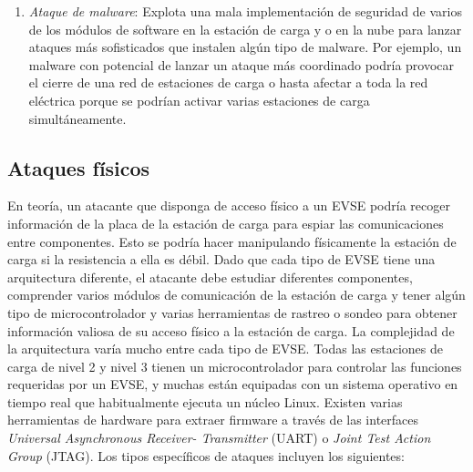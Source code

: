 \documentclass[12pt,a4paper,onecolumn,oneside]{report}
\begin{document}
\begin{enumerate}
\item \textit{Ataque de malware}: Explota una mala implementación de seguridad de varios de los módulos de software en la estación de carga y o en la nube para lanzar ataques más sofisticados que instalen algún tipo de malware. Por ejemplo, un malware con potencial de lanzar un ataque más coordinado podría provocar el cierre de una red de estaciones de carga o hasta afectar a toda la red eléctrica porque se podrían activar varias estaciones de carga simultáneamente.

\end{enumerate}



\subsection{Ataques físicos}

En teoría, un atacante que disponga de acceso físico a un EVSE podría recoger información de la placa de la estación de carga para espiar las comunicaciones entre componentes. Esto se podría hacer manipulando físicamente la estación de carga si la resistencia a ella es débil. Dado que cada tipo de EVSE tiene una arquitectura diferente, el atacante debe estudiar diferentes componentes, comprender varios módulos de comunicación de la estación de carga y tener algún tipo de microcontrolador y varias herramientas de rastreo o sondeo para obtener información valiosa de su acceso físico a la estación de carga. La complejidad de la arquitectura varía mucho entre cada tipo de EVSE. Todas las estaciones de carga de nivel 2 y nivel 3 tienen un microcontrolador para controlar las funciones requeridas por un EVSE, y muchas están equipadas con un sistema operativo en tiempo real que habitualmente ejecuta un núcleo Linux. Existen varias herramientas de hardware para extraer firmware a través de las interfaces \textit{Universal Asynchronous Receiver- Transmitter} (UART) o \textit{Joint Test Action Group} (JTAG). Los tipos específicos de ataques incluyen los siguientes:
\end{document}
